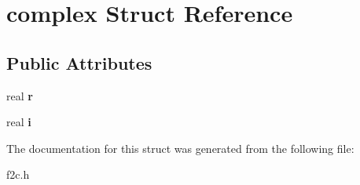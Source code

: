 \hypertarget{structcomplex}{
\section{complex Struct Reference}
\label{structcomplex}
}
\subsection*{Public Attributes}
\begin{DoxyCompactItemize}
\item 
\hypertarget{structcomplex_a03cba9844d71e49f4ddf7c5f3dd45822}{
real {\bfseries r}}
\label{structcomplex_a03cba9844d71e49f4ddf7c5f3dd45822}

\item 
\hypertarget{structcomplex_aa55283d87e8d89c794bac746fb11d524}{
real {\bfseries i}}
\label{structcomplex_aa55283d87e8d89c794bac746fb11d524}

\end{DoxyCompactItemize}


The documentation for this struct was generated from the following file:\begin{DoxyCompactItemize}
\item 
f2c.h\end{DoxyCompactItemize}

